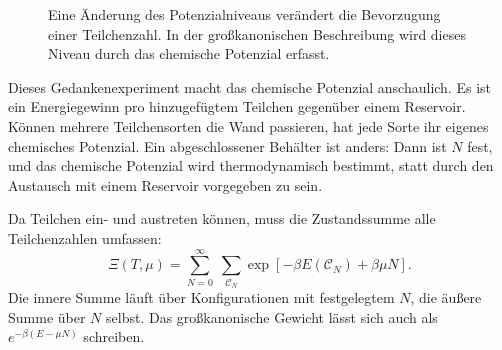 \begin{figure}[ht]
\centering
{}
\caption{Eine Änderung des Potenzialniveaus verändert die Bevorzugung einer Teilchenzahl. In der großkanonischen Beschreibung wird dieses Niveau durch das chemische Potenzial erfasst.}
\end{figure}

Dieses Gedankenexperiment macht das chemische Potenzial anschaulich. Es ist ein Energiegewinn pro hinzugefügtem Teilchen gegenüber einem Reservoir. Können mehrere Teilchensorten die Wand passieren, hat jede Sorte ihr eigenes chemisches Potenzial. Ein abgeschlossener Behälter ist anders: Dann ist \(N\) fest, und das chemische Potenzial wird thermodynamisch bestimmt, statt durch den Austausch mit einem Reservoir vorgegeben zu sein.

\begin{classroomqa}
\end{classroomqa}

Da Teilchen ein- und austreten können, muss die Zustandssumme alle Teilchenzahlen umfassen:
\begin{equation}
\Xi(T,\mu)
=\sum_{N=0}^{\infty}\;\sum_{\mathcal C_N}
\exp\!\left[-\beta E(\mathcal C_N)+\beta\mu N\right].
\label{eq:grand-partition}
\end{equation}
Die innere Summe läuft über Konfigurationen mit festgelegtem \(N\), die äußere Summe über \(N\) selbst. Das großkanonische Gewicht lässt sich auch als \(e^{-\beta(E-\mu N)}\) schreiben.

